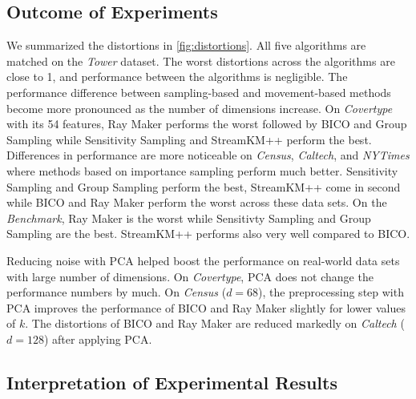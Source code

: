 \subsection{Outcome of Experiments}
We summarized the distortions in \cref{fig:distortions}.
All five algorithms are matched on the \textit{Tower} dataset. The worst distortions across the algorithms are close to 1, and performance between the algorithms is negligible. The performance difference between sampling-based and movement-based methods become more pronounced as the number of dimensions increase. On \textit{Covertype} with its 54 features, Ray Maker performs the worst followed by BICO and Group Sampling while Sensitivity Sampling and StreamKM++ perform the best. Differences in performance are more noticeable on \textit{Census}, \textit{Caltech}, and \textit{NYTimes}  where methods based on importance sampling perform much better. Sensitivity Sampling and Group Sampling perform the best, StreamKM++ come in second while BICO and Ray Maker perform the worst across these data sets.
On the \textit{Benchmark}, Ray Maker is the worst while Sensitivty Sampling and Group Sampling are the best. StreamKM++ performs also very well compared to BICO.

Reducing noise with PCA helped boost the performance on real-world data sets with large number of dimensions. On \textit{Covertype}, PCA does not change the performance numbers by much. On \textit{Census} ($d=68$), the preprocessing step with PCA improves the performance of BICO and Ray Maker slightly for lower values of $k$. The distortions of BICO and Ray Maker are reduced markedly on \textit{Caltech} ($d=128$) after applying PCA. 


\subsection{Interpretation of Experimental Results}



